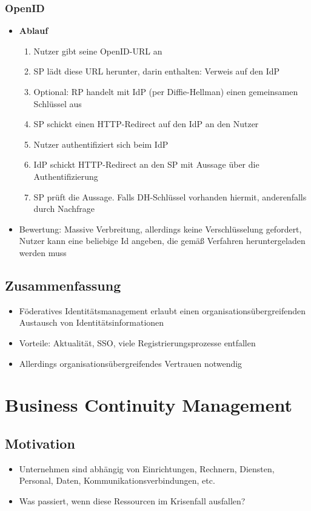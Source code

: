 \subsubsection{OpenID}
\begin{itemize}
	\item \textbf{Ablauf}
	\begin{enumerate}
		\item Nutzer gibt seine OpenID-URL an
		\item SP lädt diese URL herunter, darin enthalten: Verweis auf den IdP
		\item Optional: RP handelt mit IdP (per Diffie-Hellman) einen gemeinsamen Schlüssel aus
		\item SP schickt einen HTTP-Redirect auf den IdP an den Nutzer
		\item Nutzer authentifiziert sich beim IdP
		\item IdP schickt HTTP-Redirect an den SP mit Aussage über die Authentifizierung
		\item SP prüft die Aussage. Falls DH-Schlüssel vorhanden hiermit, anderenfalls durch Nachfrage
	\end{enumerate}
	\item Bewertung: Massive Verbreitung, allerdings keine Verschlüsselung gefordert, Nutzer kann eine beliebige Id angeben, die gemäß Verfahren heruntergeladen werden muss
\end{itemize}


\subsection{Zusammenfassung}
\begin{itemize}
	\item Föderatives Identitätsmanagement erlaubt einen organisationsübergreifenden Austausch von Identitätsinformationen
	\item Vorteile: Aktualität, SSO, viele Registrierungsprozesse entfallen
	\item Allerdings organisationsübergreifendes Vertrauen notwendig
\end{itemize}



\section{Business Continuity Management}

\subsection{Motivation}
\begin{itemize}
	\item Unternehmen sind abhängig von Einrichtungen, Rechnern, Diensten, Personal, Daten, Kommunikationsverbindungen, etc.
	\item Was passiert, wenn diese Ressourcen im Krisenfall ausfallen?
\end{itemize}



